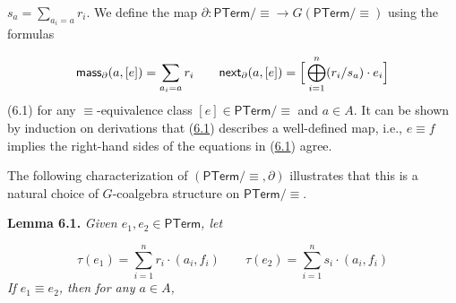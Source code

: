 \hypertarget{html:S6.SS0.SSS0.P0.SPx1.p1.m2}{}\({s_{a}=\sum_{a_{i}=a}r_{i}}\). We define the map %
\hypertarget{html:S6.SS0.SSS0.P0.SPx1.p1.m3}{}\({\partial\colon\mathsf{PTerm}/{\equiv}\to G(\mathsf{PTerm}/{\equiv})}\) using the formulas
\par\medskip
\hypertarget{html:S6.E1}{}   %
\hypertarget{html:S6.E1.m1}{}\[\mbox{\sf mass}_{\partial}(a,[e])=\sum_{a_{i}=a}r_{i}\qquad\mbox{\sf next}_{\partial}(a,[e])=\Big{[}\bigoplus_{i=1}^{n}(r_{i}/s_{a})\cdot e_{i}\Big{]}\]  (6.1)   for any %
\hypertarget{html:S6.SS0.SSS0.P0.SPx1.p1.m4}{}\({\equiv}\)-equivalence class %
\hypertarget{html:S6.SS0.SSS0.P0.SPx1.p1.m5}{}\({[e]\in\mathsf{PTerm}/{\equiv}}\) and %
\hypertarget{html:S6.SS0.SSS0.P0.SPx1.p1.m6}{}\({a\in A}\). It can be shown by induction on derivations that (\hyperlink{html:S6.E1}{6.1}) describes a well-defined map, i.e., %
\hypertarget{html:S6.SS0.SSS0.P0.SPx1.p1.m7}{}\({e\equiv f}\) implies the right-hand sides of the equations in (\hyperlink{html:S6.E1}{6.1}) agree.
\par\medskip
\hypertarget{html:S6.SS0.SSS0.P0.SPx1.p2}{} The following characterization of %
\hypertarget{html:S6.SS0.SSS0.P0.SPx1.p2.m1}{}\({(\mathsf{PTerm}/{\equiv},\partial)}\) illustrates that this is a natural choice of %
\hypertarget{html:S6.SS0.SSS0.P0.SPx1.p2.m2}{}\({G}\)-coalgebra structure on %
\hypertarget{html:S6.SS0.SSS0.P0.SPx1.p2.m3}{}\({\mathsf{PTerm}/{\equiv}}\).
\par\medskip
\hypertarget{html:S6.Thmtheorem1}{} \par\noindent\textbf{\textbf{Lemma 6.1}\textbf{.}}\quad  %
\hypertarget{html:S6.Thmtheorem1.p1}{} \emph{Given %
\hypertarget{html:S6.Thmtheorem1.p1.m1}{}\({e_{1},e_{2}\in\mathsf{PTerm}}\), let}
\par\medskip
\hypertarget{html:S6.Ex1}{}   %
\hypertarget{html:S6.Ex1.m1}{}\[\tau(e_{1})=\sum_{i=1}^{n}r_{i}\cdot(a_{i},f_{i})\qquad\tau(e_{2})=\sum_{i=1}^{n}s_{i}\cdot(a_{i},f_{i})\]    \emph{If %
\hypertarget{html:S6.Thmtheorem1.p1.m2}{}\({e_{1}\equiv e_{2}}\), then for any %
\hypertarget{html:S6.Thmtheorem1.p1.m3}{}\({a\in A}\),}
